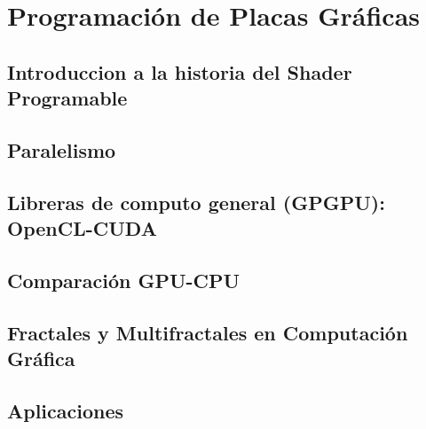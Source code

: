 \chapter{Programación de Placas Gráficas}
\section{Introduccion a la historia del Shader Programable}
\section{Paralelismo}
\section{Libreras de computo general (GPGPU): OpenCL-CUDA}
\section{Comparación GPU-CPU}
\section{Fractales y Multifractales en Computación Gráfica}
\section{Aplicaciones}
